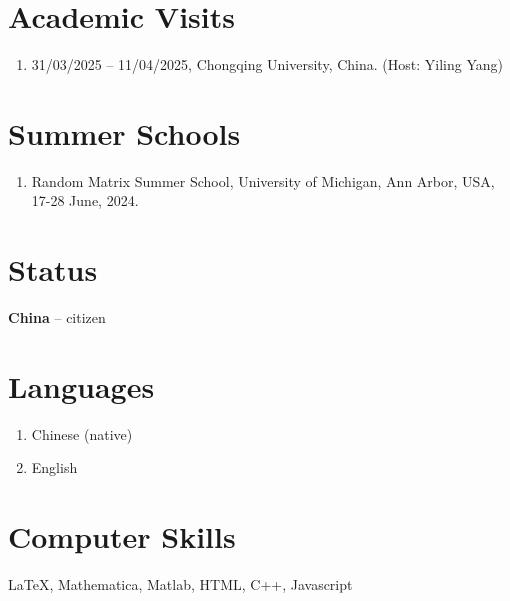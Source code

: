 \documentclass[margin]{res}
\begin{document}
\begin{resume}
\section{Academic Visits}
\begin{enumerate}[--]
\item 31/03/2025 -- 11/04/2025, Chongqing University, China. (Host: Yiling Yang)
\end{enumerate}






\section{Summer Schools}
\begin{enumerate}[--]
   \item Random Matrix Summer School, University of Michigan, Ann Arbor, USA, 17-28 June, 2024.
\end{enumerate}

\section{Status}
\textbf{China} -- citizen

\section{Languages}
\begin{enumerate}[--]
\item Chinese (native)
\item English 
\end{enumerate}

\section{Computer Skills}
\LaTeX, Mathematica, Matlab, HTML, C++, Javascript

\end{resume}
\end{document}
